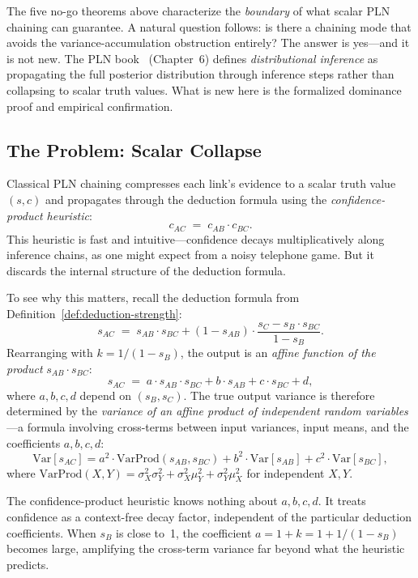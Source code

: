 \documentclass[11pt,openany]{report}
\begin{document}
The five no-go theorems above characterize the \emph{boundary} of what scalar
PLN chaining can guarantee.  A natural question follows: is there a chaining
mode that avoids the variance-accumulation obstruction entirely?  The answer
is yes---and it is not new.  The PLN book~\cite{goertzel2009pln} (Chapter~6)
defines \emph{distributional inference} as propagating the full posterior
distribution through inference steps rather than collapsing to scalar truth
values.  What is new here is the formalized dominance proof and empirical
confirmation.

\subsection*{The Problem: Scalar Collapse}

Classical PLN chaining compresses each link's evidence to a scalar truth
value $(s, c)$ and propagates through the deduction formula using the
\emph{confidence-product heuristic}:
\[
  c_{AC} \;=\; c_{AB} \cdot c_{BC}.
\]
This heuristic is fast and intuitive---confidence decays multiplicatively
along inference chains, as one might expect from a noisy telephone game.
But it discards the internal structure of the deduction formula.

To see why this matters, recall the deduction formula from
Definition~\ref{def:deduction-strength}:
\[
  s_{AC} \;=\; s_{AB} \cdot s_{BC}
    + (1 - s_{AB}) \cdot \frac{s_C - s_B \cdot s_{BC}}{1 - s_B}.
\]
Rearranging with $k = 1/(1-s_B)$, the output is an \emph{affine function
of the product} $s_{AB} \cdot s_{BC}$:
\begin{equation}
\label{eq:deduction-affine}
  s_{AC} \;=\; a \cdot s_{AB} \cdot s_{BC}
    + b \cdot s_{AB} + c \cdot s_{BC} + d,
\end{equation}
where $a, b, c, d$ depend on $(s_B, s_C)$.  The true output variance is
therefore determined by the \emph{variance of an affine product of
independent random variables}---a formula involving cross-terms between
input variances, input means, and the coefficients $a, b, c, d$:
\begin{equation}
\label{eq:true-variance}
  \mathrm{Var}[s_{AC}]
    = a^2 \cdot \mathrm{VarProd}(s_{AB}, s_{BC})
      + b^2 \cdot \mathrm{Var}[s_{AB}]
      + c^2 \cdot \mathrm{Var}[s_{BC}],
\end{equation}
where $\mathrm{VarProd}(X, Y)
  = \sigma_X^2 \sigma_Y^2
    + \sigma_X^2 \mu_Y^2
    + \sigma_Y^2 \mu_X^2$
for independent $X, Y$.

The confidence-product heuristic knows nothing about $a, b, c, d$.  It
treats confidence as a context-free decay factor, independent of the
particular deduction coefficients.  When $s_B$ is close to~1, the
coefficient $a = 1 + k = 1 + 1/(1-s_B)$ becomes large, amplifying the
cross-term variance far beyond what the heuristic predicts.
\end{document}
